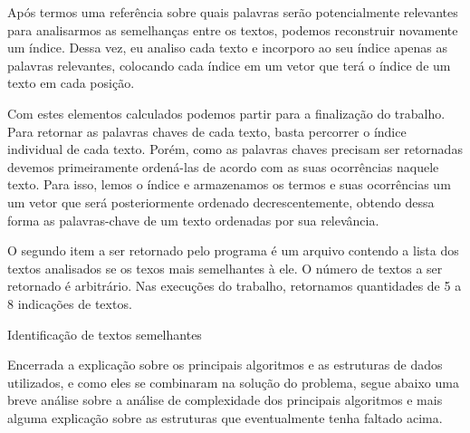\documentclass[12pt]{article}
\begin{document}
Após termos uma referência sobre quais palavras serão potencialmente relevantes
para analisarmos as semelhanças entre os textos, podemos reconstruir novamente
um índice. Dessa vez, eu analiso cada texto e incorporo ao seu índice apenas as
palavras relevantes, colocando cada índice em um vetor que terá o índice de um texto 
em cada posição.

Com estes elementos calculados podemos partir para a finalização do trabalho.
Para retornar as palavras chaves de cada texto, basta percorrer o índice
individual de cada texto. Porém, como as palavras chaves precisam ser retornadas
devemos primeiramente ordená-las de acordo com as suas ocorrências naquele
texto. Para isso, lemos o índice e armazenamos os termos e suas ocorrências um
um vetor que será posteriormente ordenado decrescentemente, obtendo dessa forma
as palavras-chave de um texto ordenadas por sua relevância.

O segundo item a ser retornado pelo programa é um arquivo contendo a lista dos
textos analisados se os texos mais semelhantes à ele. O número de textos a ser
retornado é arbitrário. Nas execuções do trabalho, retornamos quantidades de 5 a
8 indicações de textos.

\begin{algorithm}[h!]
\begin{footnotesize}
\caption{Identificação de textos semelhantes}
\end{footnotesize}
\end{algorithm}

Encerrada a explicação sobre os principais algoritmos e as estruturas de dados
utilizados, e como eles se combinaram na solução do problema, segue abaixo uma
breve análise sobre a análise de complexidade dos principais algoritmos e mais
alguma explicação sobre as estruturas que eventualmente tenha faltado acima.
\end{document}
